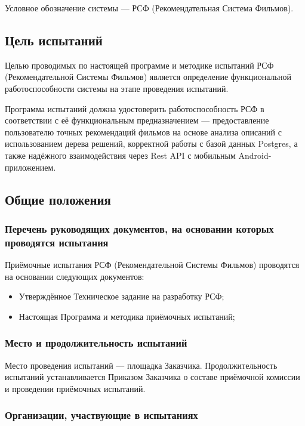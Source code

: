 Условное обозначение системы — РСФ (Рекомендательная Система Фильмов).

\subsection{Цель испытаний}

Целью проводимых по настоящей программе и методике испытаний РСФ (Рекомендательной Системы Фильмов) является определение функциональной работоспособности системы на этапе проведения испытаний.

Программа испытаний должна удостоверить работоспособность РСФ в соответствии с её функциональным предназначением — предоставление пользователю точных рекомендаций фильмов на основе анализа описаний с использованием дерева решений, корректной работы с базой данных Postgres, а также надёжного взаимодействия через Rest API с мобильным Android-приложением.

\subsection{Общие положения}

\subsubsection{Перечень руководящих документов, на основании которых проводятся испытания}

Приёмочные испытания РСФ (Рекомендательной Системы Фильмов) проводятся на основании следующих документов:

\begin{itemize}
	\item Утверждённое Техническое задание на разработку РСФ;
	\item Настоящая Программа и методика приёмочных испытаний;
\end{itemize}

\subsubsection{Место и продолжительность испытаний}

Место проведения испытаний — площадка Заказчика.
Продолжительность испытаний устанавливается Приказом Заказчика о составе приёмочной комиссии и проведении приёмочных испытаний.

\subsubsection{Организации, участвующие в испытаниях}

